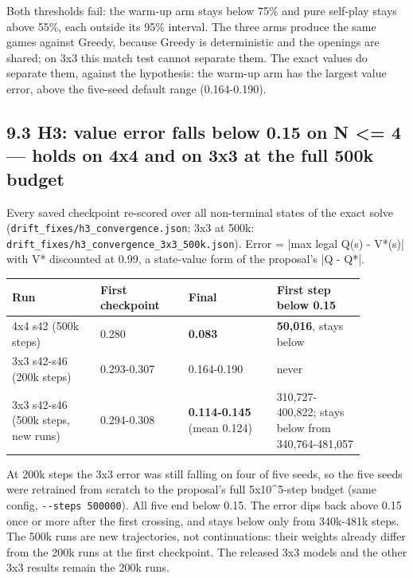 \documentclass[11pt]{article}
\begin{document}
Both thresholds fail: the warm-up arm stays below 75\% and pure self-play stays above 55\%, each
outside its 95\% interval. The three arms produce the same games against Greedy, because Greedy is
deterministic and the openings are shared; on 3x3 this match test cannot separate them. The exact
values do separate them, against the hypothesis: the warm-up arm has the largest value error,
above the five-seed default range (0.164-0.190).

\subsection{9.3 H3: value error falls below 0.15 on N <= 4 — holds on 4x4 and on 3x3 at the full 500k budget}

Every saved checkpoint re-scored over all non-terminal states of the exact solve
(\texttt{drift\_fixes/h3\_convergence.json}; 3x3 at 500k: \texttt{drift\_fixes/h3\_convergence\_3x3\_500k.json}). Error = |max legal Q(s) - V*(s)| with V* discounted at
0.99, a state-value form of the proposal's |Q - Q*|.

\begin{center}\scriptsize
\begin{longtable}{p{0.22\linewidth}p{0.22\linewidth}p{0.22\linewidth}p{0.22\linewidth}}
\toprule
Run & First checkpoint & Final & First step below 0.15 \\
\midrule
4x4 s42 (500k steps) & 0.280 & \textbf{0.083} & \textbf{50,016}, stays below \\
3x3 s42-s46 (200k steps) & 0.293-0.307 & 0.164-0.190 & never \\
3x3 s42-s46 (500k steps, new runs) & 0.294-0.308 & \textbf{0.114-0.145} (mean 0.124) & 310,727-400,822; stays below from 340,764-481,057 \\
\bottomrule
\end{longtable}
\end{center}

At 200k steps the 3x3 error was still falling on four of five seeds, so the five seeds were retrained
from scratch to the proposal's full 5x10\textasciicircum{}5-step budget (same config, \texttt{-{}-steps 500000}). All five end
below 0.15. The error dips back above 0.15 once or more after the first crossing, and stays below only
from 340k-481k steps. The 500k runs are new trajectories, not continuations: their weights already
differ from the 200k runs at the first checkpoint. The released 3x3 models and the other 3x3 results
remain the 200k runs.
\end{document}
